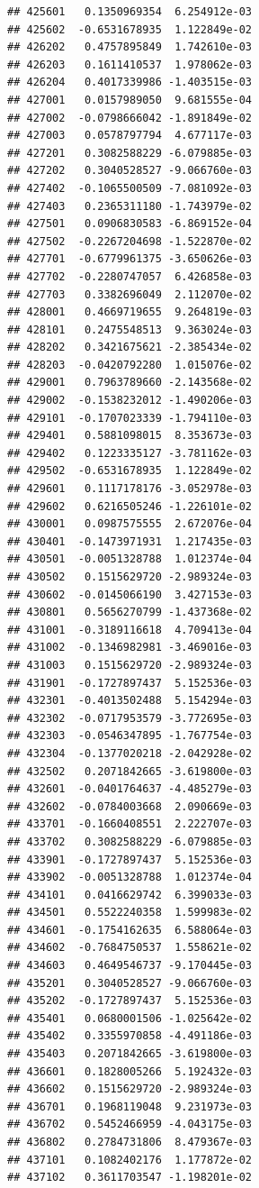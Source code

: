 \begin{frame}[fragile]
\begin{verbatim}
## 425601   0.1350969354  6.254912e-03
## 425602  -0.6531678935  1.122849e-02
## 426202   0.4757895849  1.742610e-03
## 426203   0.1611410537  1.978062e-03
## 426204   0.4017339986 -1.403515e-03
## 427001   0.0157989050  9.681555e-04
## 427002  -0.0798666042 -1.891849e-02
## 427003   0.0578797794  4.677117e-03
## 427201   0.3082588229 -6.079885e-03
## 427202   0.3040528527 -9.066760e-03
## 427402  -0.1065500509 -7.081092e-03
## 427403   0.2365311180 -1.743979e-02
## 427501   0.0906830583 -6.869152e-04
## 427502  -0.2267204698 -1.522870e-02
## 427701  -0.6779961375 -3.650626e-03
## 427702  -0.2280747057  6.426858e-03
## 427703   0.3382696049  2.112070e-02
## 428001   0.4669719655  9.264819e-03
## 428101   0.2475548513  9.363024e-03
## 428202   0.3421675621 -2.385434e-02
## 428203  -0.0420792280  1.015076e-02
## 429001   0.7963789660 -2.143568e-02
## 429002  -0.1538232012 -1.490206e-03
## 429101  -0.1707023339 -1.794110e-03
## 429401   0.5881098015  8.353673e-03
## 429402   0.1223335127 -3.781162e-03
## 429502  -0.6531678935  1.122849e-02
## 429601   0.1117178176 -3.052978e-03
## 429602   0.6216505246 -1.226101e-02
## 430001   0.0987575555  2.672076e-04
## 430401  -0.1473971931  1.217435e-03
## 430501  -0.0051328788  1.012374e-04
## 430502   0.1515629720 -2.989324e-03
## 430602  -0.0145066190  3.427153e-03
## 430801   0.5656270799 -1.437368e-02
## 431001  -0.3189116618  4.709413e-04
## 431002  -0.1346982981 -3.469016e-03
## 431003   0.1515629720 -2.989324e-03
## 431901  -0.1727897437  5.152536e-03
## 432301  -0.4013502488  5.154294e-03
## 432302  -0.0717953579 -3.772695e-03
## 432303  -0.0546347895 -1.767754e-03
## 432304  -0.1377020218 -2.042928e-02
## 432502   0.2071842665 -3.619800e-03
## 432601  -0.0401764637 -4.485279e-03
## 432602  -0.0784003668  2.090669e-03
## 433701  -0.1660408551  2.222707e-03
## 433702   0.3082588229 -6.079885e-03
## 433901  -0.1727897437  5.152536e-03
## 433902  -0.0051328788  1.012374e-04
## 434101   0.0416629742  6.399033e-03
## 434501   0.5522240358  1.599983e-02
## 434601  -0.1754162635  6.588064e-03
## 434602  -0.7684750537  1.558621e-02
## 434603   0.4649546737 -9.170445e-03
## 435201   0.3040528527 -9.066760e-03
## 435202  -0.1727897437  5.152536e-03
## 435401   0.0680001506 -1.025642e-02
## 435402   0.3355970858 -4.491186e-03
## 435403   0.2071842665 -3.619800e-03
## 436601   0.1828005266  5.192432e-03
## 436602   0.1515629720 -2.989324e-03
## 436701   0.1968119048  9.231973e-03
## 436702   0.5452466959 -4.043175e-03
## 436802   0.2784731806  8.479367e-03
## 437101   0.1082402176  1.177872e-02
## 437102   0.3611703547 -1.198201e-02

\end{verbatim}
\end{frame}
